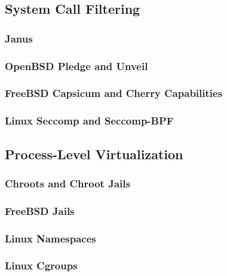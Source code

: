 \subsection{System Call Filtering}%
\label{ss:syscall-filtering}

\subsubsection*{Janus}
\label{sss:janus}

\subsubsection*{OpenBSD Pledge and Unveil}
\label{sss:pledge}

\subsubsection*{FreeBSD Capsicum and Cherry Capabilities}
\label{sss:capsicum}

\subsubsection*{Linux Seccomp and Seccomp-BPF}%
\label{sss:seccomp}



\subsection{Process-Level Virtualization}%
\label{ss:virtualization}

\subsubsection*{Chroots and Chroot Jails}

\subsubsection*{FreeBSD Jails}

\subsubsection*{Linux Namespaces}

\subsubsection*{Linux Cgroups}



